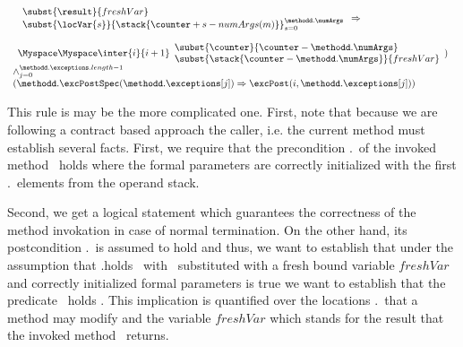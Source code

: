\begin{itemize}
$$\begin{array}{l}
\begin{array}{l}
\begin{array}{l}
									                                    \subst{\result}{  freshVar } \\
													    \subst{ \locVar{s}}{\stack{\counter + s - numArgs(m)}}_{s = 0}^{ \methodd.\numArgs }                                                                                                	\end{array}  \Rightarrow \\ 
										      \\
										      \Myspace  \Myspace  \inter{i}{i+1 } \begin{array}{l}
										                                   \subst{\counter}{ \counter -  \methodd.\numArgs}\\
														   \subst{ \stack{\counter -  \methodd.\numArgs  }}{ freshVar }																	\end{array}																									
	 				 			 )	\end{array}  \\
	 				 			\wedge_{j = 0 }^{\methodd.\exceptions.length -1} \\
                                                               ( \methodd. \excPostSpec ( \methodd.\exceptions[j]) \Rightarrow 
                                                                    \excPost(i,   \methodd.\exceptions[j] )  ) \\		
	 				 			\end{array}
	 				 			$$ 
	 			

						This rule is may be the more complicated one.
						First, note that because we are following a contract based approach 
						the caller, i.e. the current method must establish several facts.
						First, we require that 
						the precondition \methodd.\pre \ of the invoked method \methodd \ holds where the formal 
						parameters are correctly initialized with the
						first \methodd.\numArgs \ elements from the operand stack.
						
						Second, we get a logical statement which guarantees the correctness of the method invokation
						in case of normal termination.
						On the other hand, its postcondition  \methodd.\normalPost \ is assumed to hold and thus, we want to establish that 
						under the assumption that \methodd.\normalPost holds \ with \result \ substituted with a fresh bound variable $freshVar$
						and correctly initialized formal parameters
						is true we want to establish that the predicate    \
						holds . This implication is quantified over the locations  \method.\modif \ that a method may modify
						and the variable $freshVar$ which stands for the result that the invoked method \methodd \ returns.  
						

\end{itemize}
